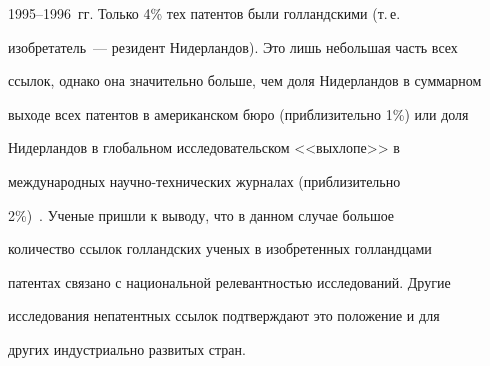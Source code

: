      1995--1996~гг. Только 4\% тех патентов были голландскими (т.\,е.\ 


изобретатель~--- резидент Нидерландов). Это лишь небольшая часть всех 


ссылок, однако она значительно больше, чем доля Нидерландов в суммарном 


выходе всех патентов в американском бюро (приблизительно 1\%) или доля 


Нидерландов в глобальном исследовательском <<выхлопе>> в 


международных на\-уч\-но-тех\-ни\-че\-ских журналах (приблизительно 


2\%)~\cite{1-koz}. Ученые пришли к выводу, что в данном случае большое 


количество ссылок голландских ученых в изобретенных голландцами 


патентах связано с национальной релевантностью исследований. Другие 


исследования непатентных ссылок подтверждают это положение и для 


других индустриально развитых стран.


